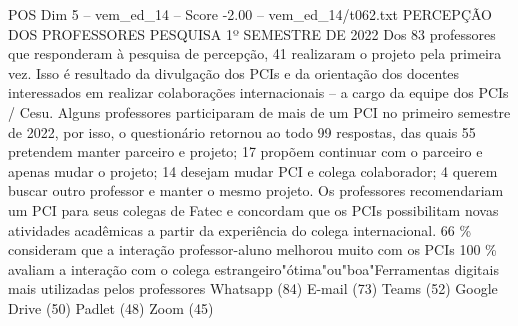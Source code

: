 \begin{textsample}{POS Dim 5 – vem\_ed\_14 – Score -2.00 – vem\_ed\_14/t062.txt}  \label{ex:f5_pos_160}
PERCEPÇÃO DOS PROFESSORES PESQUISA 1º SEMESTRE DE 2022 Dos 83 professores que responderam à pesquisa de percepção, 41 realizaram o projeto pela primeira vez.
Isso é resultado da divulgação dos PCIs e da orientação dos docentes interessados em realizar colaborações internacionais – a cargo da equipe dos PCIs / Cesu.
Alguns professores participaram de mais de um PCI no primeiro semestre de 2022, por isso, o questionário retornou ao todo 99 respostas, das quais 55 pretendem manter parceiro e projeto; 17 propõem continuar com o parceiro e apenas mudar o projeto; 14 desejam mudar PCI e colega colaborador; 4 querem buscar outro professor e manter o mesmo projeto.
Os professores recomendariam um PCI para seus colegas de Fatec e concordam que os PCIs possibilitam novas atividades acadêmicas a partir da experiência do colega internacional. 66 \% consideram que a interação professor-aluno melhorou muito com os PCIs 100 \% avaliam a interação com o colega estrangeiro"ótima"ou"boa"Ferramentas digitais mais utilizadas pelos professores Whatsapp (84) E-mail (73) Teams (52) Google Drive (50) Padlet (48) Zoom (45)

\end{textsample}
